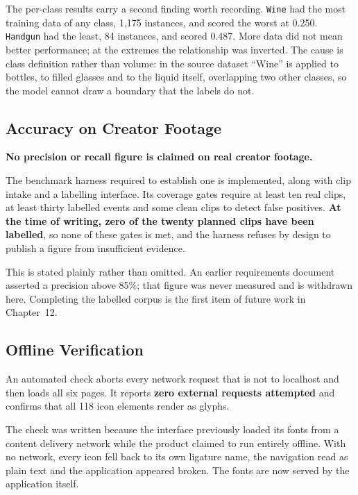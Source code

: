 \documentclass[
12pt,
a4paper,
oneside
]{report}
\begin{document}
The per-class results carry a second finding worth recording. \texttt{Wine} had
the most training data of any class, 1{,}175 instances, and scored the worst at
0.250. \texttt{Handgun} had the least, 84 instances, and scored 0.487. More data
did not mean better performance; at the extremes the relationship was inverted.
The cause is class definition rather than volume: in the source dataset ``Wine''
is applied to bottles, to filled glasses and to the liquid itself, overlapping
two other classes, so the model cannot draw a boundary that the labels do not.

\subsection{Accuracy on Creator Footage}
\label{sec:accuracy}

\textbf{No precision or recall figure is claimed on real creator footage.}

The benchmark harness required to establish one is implemented, along with clip
intake and a labelling interface. Its coverage gates require at least ten real
clips, at least thirty labelled events and some clean clips to detect false
positives. \textbf{At the time of writing, zero of the twenty planned clips have
been labelled}, so none of these gates is met, and the harness refuses by design
to publish a figure from insufficient evidence.

This is stated plainly rather than omitted. An earlier requirements document
asserted a precision above 85\%; that figure was never measured and is withdrawn
here. Completing the labelled corpus is the first item of future work in
Chapter~12.

\subsection{Offline Verification}
\label{sec:offlinecheck}

An automated check aborts every network request that is not to localhost and
then loads all six pages. It reports \textbf{zero external requests attempted}
and confirms that all 118 icon elements render as glyphs.

The check was written because the interface previously loaded its fonts from a
content delivery network while the product claimed to run entirely offline. With
no network, every icon fell back to its own ligature name, the navigation read
as plain text and the application appeared broken. The fonts are now served by
the application itself.
\end{document}
